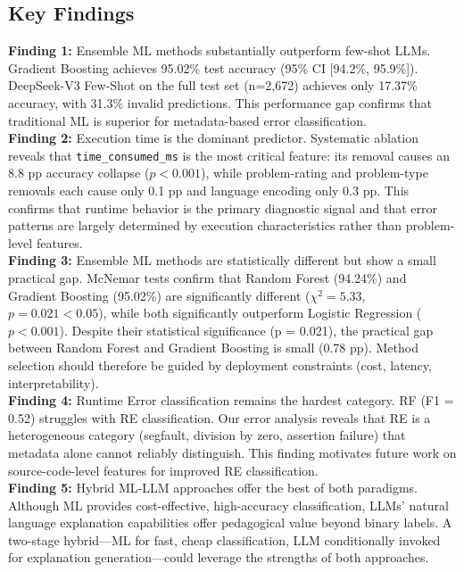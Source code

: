 \documentclass[10pt,letterpaper]{article}
\begin{document}
\subsection*{Key Findings}
\begin{flushleft}
\textbf{Finding 1:} Ensemble ML methods substantially outperform few-shot LLMs. Gradient Boosting achieves 95.02\% test accuracy (95\% CI [94.2\%, 95.9\%]). DeepSeek-V3 Few-Shot on the full test set (n=2,672) achieves only 17.37\% accuracy, with 31.3\% invalid predictions. This performance gap confirms that traditional ML is superior for metadata-based error classification.\\
\textbf{Finding 2:} Execution time is the dominant predictor. Systematic ablation reveals that \texttt{time\_consumed\_ms} is the most critical feature: its removal causes an 8.8 pp accuracy collapse ($p < 0.001$), while problem-rating and problem-type removals each cause only 0.1 pp and language encoding only 0.3 pp. This confirms that runtime behavior is the primary diagnostic signal and that error patterns are largely determined by execution characteristics rather than problem-level features.\\
\textbf{Finding 3:} Ensemble ML methods are statistically different but show a small practical gap. McNemar tests confirm that Random Forest (94.24\%) and Gradient Boosting (95.02\%) are significantly different ($\chi^2 = 5.33$, $p = 0.021 < 0.05$), while both significantly outperform Logistic Regression ($p < 0.001$). Despite their statistical significance (p = 0.021), the practical gap between Random Forest and Gradient Boosting is small (0.78 pp). Method selection should therefore be guided by deployment constraints (cost, latency, interpretability).\\
\textbf{Finding 4:} Runtime Error classification remains the hardest category. RF (F1 = 0.52) struggles with RE classification. Our error analysis reveals that RE is a heterogeneous category (segfault, division by zero, assertion failure) that metadata alone cannot reliably distinguish. This finding motivates future work on source-code-level features for improved RE classification.\\
\textbf{Finding 5:} Hybrid ML-LLM approaches offer the best of both paradigms. Although ML provides cost-effective, high-accuracy classification, LLMs' natural language explanation capabilities offer pedagogical value beyond binary labels. A two-stage hybrid---ML for fast, cheap classification, LLM conditionally invoked for explanation generation---could leverage the strengths of both approaches.\\
\end{flushleft}
\end{document}
